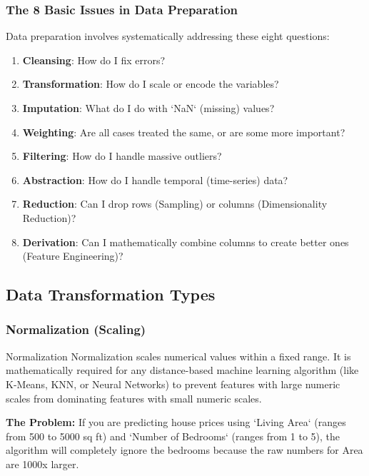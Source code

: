 \subsubsection{The 8 Basic Issues in Data Preparation}
Data preparation involves systematically addressing these eight questions:
\begin{enumerate}
    \item \textbf{Cleansing}: How do I fix errors?
    \item \textbf{Transformation}: How do I scale or encode the variables?
    \item \textbf{Imputation}: What do I do with `NaN` (missing) values?
    \item \textbf{Weighting}: Are all cases treated the same, or are some more important?
    \item \textbf{Filtering}: How do I handle massive outliers?
    \item \textbf{Abstraction}: How do I handle temporal (time-series) data?
    \item \textbf{Reduction}: Can I drop rows (Sampling) or columns (Dimensionality Reduction)?
    \item \textbf{Derivation}: Can I mathematically combine columns to create better ones (Feature Engineering)?
\end{enumerate}

\subsection{Data Transformation Types}

\subsubsection{Normalization (Scaling)}

\begin{defbox}{Normalization}
 Normalization scales numerical values within a fixed range. It is mathematically required for any distance-based machine learning algorithm (like K-Means, KNN, or Neural Networks) to prevent features with large numeric scales from dominating features with small numeric scales.
\end{defbox}

\textbf{The Problem:} If you are predicting house prices using `Living Area` (ranges from 500 to 5000 sq ft) and `Number of Bedrooms` (ranges from 1 to 5), the algorithm will completely ignore the bedrooms because the raw numbers for Area are 1000x larger.

